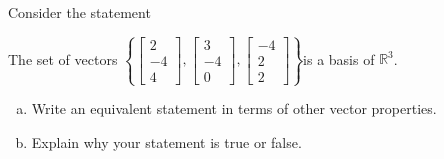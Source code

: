 
\begin{exerciseStatement}


Consider the statement 
\begin{center}\begin{minipage}{0.8\textwidth}
 The set of vectors \( \left\{ \left[\begin{array}{c}
2 \\
-4 \\
4
\end{array}\right] , \left[\begin{array}{c}
3 \\
-4 \\
0
\end{array}\right] , \left[\begin{array}{c}
-4 \\
2 \\
2
\end{array}\right] \right\} \)is a basis of \(\mathbb{R}^3\). 
\end{minipage}\end{center}
    


\begin{enumerate}[(a)]
\item  Write an equivalent statement in terms of other vector properties.
\item  Explain why your statement is true or false.
\end{enumerate}
    
\end{exerciseStatement}
    

